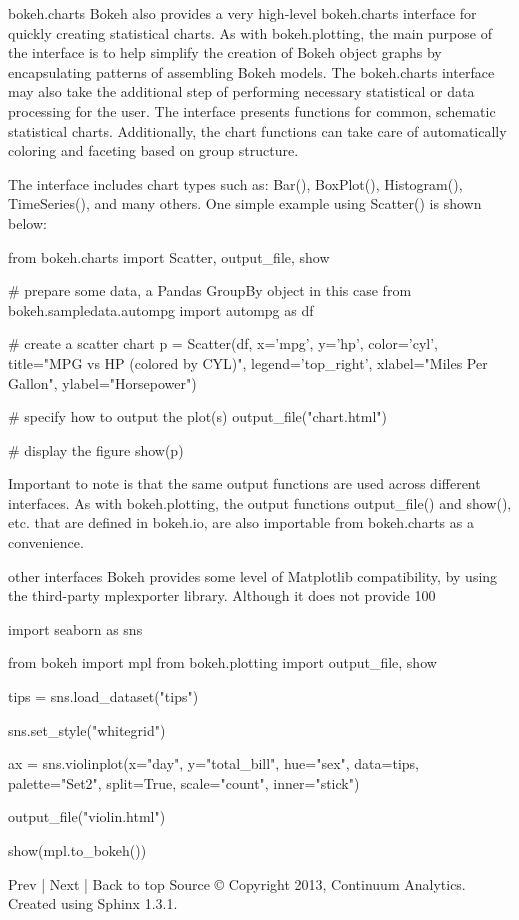 bokeh.charts
Bokeh also provides a very high-level bokeh.charts interface for quickly creating statistical charts. As with bokeh.plotting, the main purpose of the interface is to help simplify the creation of Bokeh object graphs by encapsulating patterns of assembling Bokeh models. The bokeh.charts interface may also take the additional step of performing necessary statistical or data processing for the user. The interface presents functions for common, schematic statistical charts. Additionally, the chart functions can take care of automatically coloring and faceting based on group structure.

The interface includes chart types such as: Bar(), BoxPlot(), Histogram(), TimeSeries(), and many others. One simple example using Scatter() is shown below:

from bokeh.charts import Scatter, output_file, show

# prepare some data, a Pandas GroupBy object in this case
from bokeh.sampledata.autompg import autompg as df

# create a scatter chart
p = Scatter(df, x='mpg', y='hp', color='cyl',
            title="MPG vs HP (colored by CYL)",
            legend='top_right',
            xlabel="Miles Per Gallon",
            ylabel="Horsepower")

# specify how to output the plot(s)
output_file("chart.html")

# display the figure
show(p)
	
Important to note is that the same output functions are used across different interfaces. As with bokeh.plotting, the output functions output_file() and show(), etc. that are defined in bokeh.io, are also importable from bokeh.charts as a convenience.

other interfaces
Bokeh provides some level of Matplotlib compatibility, by using the third-party mplexporter library. Although it does not provide 100%

import seaborn as sns

from bokeh import mpl
from bokeh.plotting import output_file, show

tips = sns.load_dataset("tips")

sns.set_style("whitegrid")

ax = sns.violinplot(x="day", y="total_bill", hue="sex",
                    data=tips, palette="Set2", split=True,
                    scale="count", inner="stick")

output_file("violin.html")

show(mpl.to_bokeh())
	
Prev | Next | Back to top 
Source
© Copyright 2013, Continuum Analytics.
Created using Sphinx 1.3.1.
